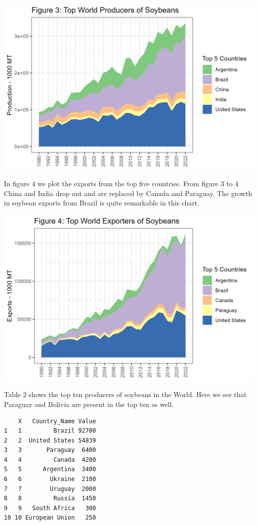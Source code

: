 \documentclass[
  letterpaper,
  DIV=11,
  numbers=noendperiod]{scrreprt}
\begin{document}
\includegraphics{assets/SouthAmericanProd_TopProdSoy.png}

In figure 4 we plot the exports from the top five countries. From figure
3 to 4 China and India drop out and are replaced by Canada and Paraguay.
The growth in soybean exports from Brazil is quite remarkable in this
chart.

\includegraphics{assets/SouthAmericanProd_TopExporterSoy.png}

Table 2 shows the top ten producers of soybeans in the World. Here we
see that Paraguay and Bolivia are present in the top ten as well.

\begin{verbatim}
    X   Country_Name Value
1   1         Brazil 92700
2   2  United States 54839
3   3       Paraguay  6400
4   4         Canada  4200
5   5      Argentina  3400
6   6        Ukraine  2100
7   7        Uruguay  2000
8   8         Russia  1450
9   9   South Africa   300
10 10 European Union   250
\end{verbatim}
\end{document}
